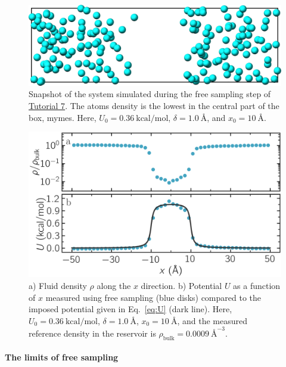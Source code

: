 \documentclass[9pt,tutorial]{livecoms}
\newcommand{\lmpcmd}[1]{\hspace{0pt}\colorbox{listing}{\textcolor{command}{\small{#1}}}\hspace{0pt}} %
\begin{document}
\begin{figure}
\centering
\includegraphics[width=\linewidth]{US-system-unbiased}
\caption{Snapshot of the system simulated during the free sampling
step of \hyperref[umbrella-sampling-label]{Tutorial 7}.
The atoms density is the lowest in the central
part of the box, \lmpcmd{mymes}.  Here,
$U_0 = 0.36~\text{kcal/mol}$, $\delta = 1.0~\text{\AA{}}$, and $x_0 = 10~\text{\AA{}}$.}
\label{fig:US-system-unbiased}
\end{figure}

\begin{figure}
\centering
\includegraphics[width=\linewidth]{US-density}
\caption{a) Fluid density $\rho$ along the $x$ direction.
b) Potential $U$ as a function of $x$ measured using free sampling (blue disks)
compared to the imposed potential given in Eq.~\eqref{eq:U} (dark line).
Here, $U_0 = 0.36~\text{kcal/mol}$, $\delta = 1.0~\text{\AA{}}$, $x_0 = 10~\text{\AA{}}$,
and the measured reference density in the reservoir is $\rho_\text{bulk} = 0.0009~\text{\AA{}}^{-3}$.} %
\label{fig:US-density}
\end{figure}

\paragraph{The limits of free sampling}
\end{document}
